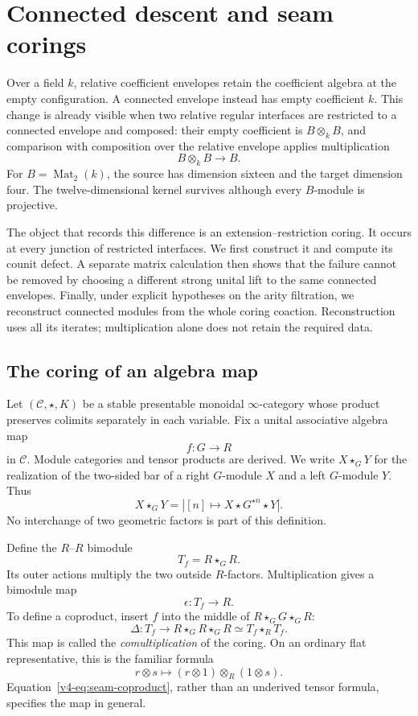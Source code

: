 \chapter{Connected descent and seam corings}
\label{v4-ch:connected-descent}

Over a field \(k\), relative coefficient envelopes retain the coefficient algebra at the empty
configuration. A connected envelope instead has empty coefficient \(k\).
This change is already visible when two relative regular interfaces are
restricted to a connected envelope and composed:
their empty coefficient is \(B\otimes_k B\), and comparison with composition
over the relative envelope applies multiplication
\[
 B\otimes_k B\longrightarrow B.
\]
For \(B=\operatorname{Mat}_2(k)\), the source has dimension sixteen and the
target dimension four. The twelve-dimensional kernel survives although
every \(B\)-module is projective.

The object that records this difference is an extension--restriction coring.
It occurs at every junction of restricted interfaces. We first construct
it and compute its counit defect. A separate matrix calculation then shows
that the failure cannot be removed by choosing a different strong unital
lift to the same connected envelopes. Finally, under explicit hypotheses
on the arity filtration, we reconstruct connected modules from the whole
coring coaction. Reconstruction uses all its iterates; multiplication alone
does not retain the required data.

\section{The coring of an algebra map}
\label{v4-sec:seam-coring}

Let \((\mathcal C,\star,K)\) be a stable presentable monoidal
\(\infty\)-category whose product preserves colimits separately in
each variable. Fix a unital associative algebra map
\[
 f:G\longrightarrow R
\]
in \(\mathcal C\). Module categories and tensor products are derived.
We write \(X\star_G Y\) for the realization of the two-sided bar of a
right \(G\)-module \(X\) and a left \(G\)-module \(Y\). Thus
\[
 X\star_G Y
 =
 \left|[n]\longmapsto X\star G^{\star n}\star Y\right|.
\]
No interchange of two geometric factors is part of this definition.

Define the \(R\)--\(R\) bimodule
\[
 T_f=R\star_G R.
\]
Its outer actions multiply the two outside \(R\)-factors. Multiplication
gives a bimodule map
\[
 \epsilon:T_f\longrightarrow R.
\]
To define a coproduct, insert \(f\) into the middle of
\(R\star_G G\star_G R\):
\begin{equation}\label{v4-eq:seam-coproduct}
\Delta:T_f\longrightarrow
 R\star_G R\star_G R
 \simeq T_f\star_R T_f.
\end{equation}
This map is called the \emph{comultiplication} of the coring.
On an ordinary flat representative, this is the familiar formula
\[
 r\otimes s\longmapsto
 (r\otimes1)\otimes_R(1\otimes s).
\]
Equation~\eqref{v4-eq:seam-coproduct}, rather than an underived tensor
formula, specifies the map in general.

